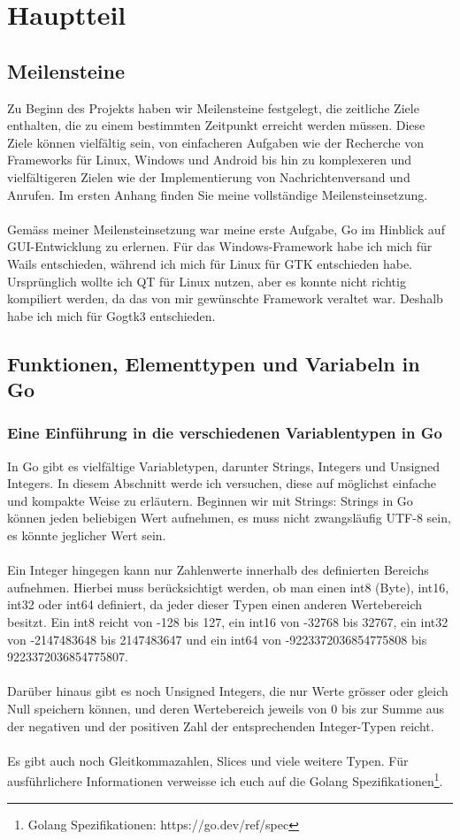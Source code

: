 \section{Hauptteil}
\subsection{Meilensteine}
Zu Beginn des Projekts haben wir Meilensteine festgelegt, die zeitliche Ziele enthalten, die zu einem bestimmten Zeitpunkt erreicht werden müssen.
Diese Ziele können vielfältig sein, von einfacheren Aufgaben wie der Recherche von Frameworks für Linux, Windows und Android bis hin zu komplexeren und vielfältigeren Zielen wie der Implementierung von Nachrichtenversand und Anrufen.
Im ersten Anhang finden Sie meine vollständige Meilensteinsetzung. \\\\
Gemäss meiner Meilensteinsetzung war meine erste Aufgabe, Go im Hinblick auf
GUI-Entwicklung zu erlernen. Für das Windows-Framework habe ich mich für Wails \cite{wails} entschieden, während ich mich für Linux für GTK entschieden habe.
Ursprünglich wollte ich QT \cite{qt} für Linux nutzen, aber es konnte nicht richtig kompiliert werden, da das von mir gewünschte Framework veraltet war. Deshalb habe ich mich für Gogtk3 \cite{gogtk3} entschieden.
\subsection{Funktionen, Elementtypen und Variabeln in Go}
\subsubsection{Eine Einführung in die verschiedenen Variablentypen in Go}
In Go gibt es vielfältige Variabletypen, darunter Strings, Integers und Unsigned Integers. In diesem Abschnitt werde ich versuchen, diese auf möglichst einfache und kompakte Weise zu erläutern. Beginnen wir mit Strings: Strings in Go können jeden beliebigen Wert aufnehmen, es muss nicht zwangsläufig UTF-8 sein, es könnte jeglicher Wert sein.\\\\
Ein Integer hingegen kann nur Zahlenwerte innerhalb des definierten Bereichs aufnehmen. Hierbei muss berücksichtigt werden, ob man einen int8 (Byte), int16, int32 oder int64 definiert, da jeder dieser Typen einen anderen Wertebereich besitzt. Ein int8 reicht von -128 bis 127, ein int16 von -32768 bis 32767, ein int32 von -2147483648 bis 2147483647 und ein int64 von -9223372036854775808 bis 9223372036854775807.\\\\
Darüber hinaus gibt es noch Unsigned Integers, die nur Werte grösser oder gleich Null speichern können, und deren Wertebereich jeweils von 0 bis zur Summe aus der negativen und der positiven Zahl der entsprechenden Integer-Typen reicht.\\\\
Es gibt auch noch Gleitkommazahlen, Slices und viele weitere Typen. Für ausführlichere Informationen verweisse ich euch auf die Golang Spezifikationen\footnote{Golang Spezifikationen: https://go.dev/ref/spec}.
